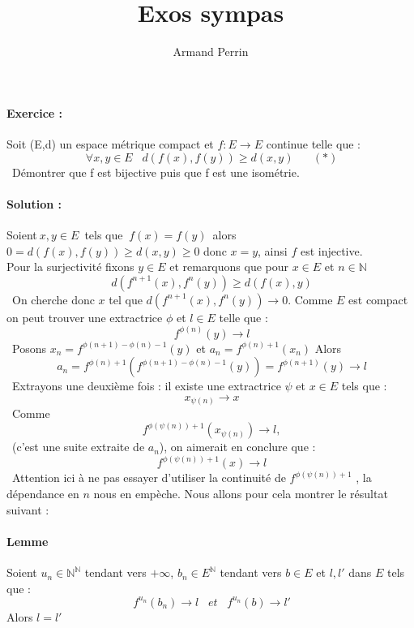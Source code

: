 \documentclass{article}
\title{Exos sympas}
\author{Armand Perrin}
\begin{document}
\maketitle

\paragraph{Exercice :}

Soit (E,d) un espace métrique
 compact et \begin{math} 
f: E\rightarrow  E 
\end{math} continue 
telle que : \\ 
\[\
\forall x,y \in E\;\;\; d(f(x),f(y)) \geq d(x,y) \;\;\;\;\;\;(*)
\]\
Démontrer que f est bijective puis que f est une isométrie.
\paragraph{Solution :} 
Soient\(\ x,y \in E \)\ tels que \(\ 
f(x) = f(y) \)\ alors $ 0 = d(f(x),f(y)) \geq d(x,y) \geq 0 $
donc $x= y $, ainsi $f$ est injective.\\
Pour la surjectivité fixons $y\in E$ et remarquons que pour $x\in E$ et $n\in \mathbb{N}$ \[\
d(f^{n+1}(x),f^{n}(y)) \geq d(f(x),y)
\]\ On cherche donc $x$ tel que $d(f^{n+1}(x),f^{n}(y)) \rightarrow 0$.
Comme $E$ est compact on peut trouver  une extractrice $\phi$ et $l\in E$ telle que : \[\ f^{\phi(n)}(y)\rightarrow l
\]\  Posons $x_n = f^{\phi(n+1)-\phi(n)-1}(y)$ et $a_n = f^{\phi(n)+1}(x_n)$
 Alors 
\[\ a_n = 
f^{\phi(n)+1}(f^{\phi(n+1)-\phi(n)-1}(y)) = f^{\phi(n+1)}(y) \rightarrow l
\]\
Extrayons une deuxième fois : il existe une extractrice $\psi$ et $x \in E$ tels que : 
\[\ x_{\psi(n)} \rightarrow x
\]\ Comme 
\[\ f^{\phi(\psi(n))+1}(x_{\psi(n)}) \rightarrow l,  \]\ (c'est une suite extraite de $a_n$), on aimerait en conclure que : 
\[\ f^{\phi(\psi(n))+1}(x) \rightarrow l
\]\ Attention ici à ne pas essayer d'utiliser la continuité de $f^{\phi(\psi(n))+1}$ , la dépendance en $n$ nous en empèche.
Nous allons pour cela montrer le résultat suivant : 
\paragraph{Lemme}
Soient $u_n \in \mathbb{N}^{\mathbb{N}}$ tendant vers $+\infty$, $b_n \in E^{\mathbb{N}} $ tendant vers $b \in E$ et $l,l'$  dans $E$ tels que : 
\[\ f^{u_n}(b_n) \rightarrow l \;\;\;et\;\;\;  f^{u_n}(b) \rightarrow l' \] Alors $l = l'$
\end{document}
